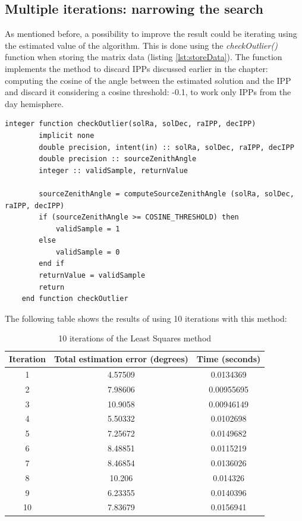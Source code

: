 \subsection{Multiple iterations: narrowing the search} \label{sssec:covariance}

As mentioned before, a possibility to improve the result could be iterating using the estimated value of the algorithm. This is done using the \textit{checkOutlier()} function when storing the matrix data (listing \ref{lst:storeData}). The function implements the method to discard IPPs discussed earlier in the chapter:  computing the cosine of the angle between the estimated solution and the IPP and discard it considering a cosine threshold: -0.1, to work only IPPs from the day hemisphere.

\begin{minipage}{\linewidth}
	\label{lst:checkOutlier}
	\begin{lstlisting}[style=myFortranStyle, caption=Function checkOutlier to discard outliers]
	integer function checkOutlier(solRa, solDec, raIPP, decIPP)
		implicit none
		double precision, intent(in) :: solRa, solDec, raIPP, decIPP
		double precision :: sourceZenithAngle
		integer :: validSample, returnValue

		sourceZenithAngle = computeSourceZenithAngle (solRa, solDec, raIPP, decIPP)
		if (sourceZenithAngle >= COSINE_THRESHOLD) then
			validSample = 1
		else
			validSample = 0
		end if
		returnValue = validSample
		return
	end function checkOutlier\end{lstlisting}
\end{minipage}

The following table shows the results of using 10 iterations with this method:

\begin{table}[h!]
	\centering
	\def\arraystretch{1.2}
	\begin{tabular}{|c c c|} 
		\hline
		Iteration & Total estimation error (degrees) & Time (seconds) \\ [0.5ex] 
		\hline\hline
		1  & 4.57509 & 0.0134369 \\
		\hline
		2  & 7.98606 & 0.00955695 \\
		\hline
		3  & 10.9058 & 0.00946149 \\
		\hline
		4  & 5.50332 & 0.0102698 \\
		\hline
		5  & 7.25672 & 0.0149682 \\
		\hline
		6  & 8.48851 & 0.0115219 \\
		\hline
		7  & 8.46854 & 0.0136026 \\
		\hline
		8  & 10.206 & 0.014326 \\
		\hline
		9  & 6.23355 & 0.0140396 \\
		\hline
		10  & 7.83679 & 0.0156941 \\
		\hline
	\end{tabular}
	\caption{10 iterations of the Least Squares method}
\end{table}

